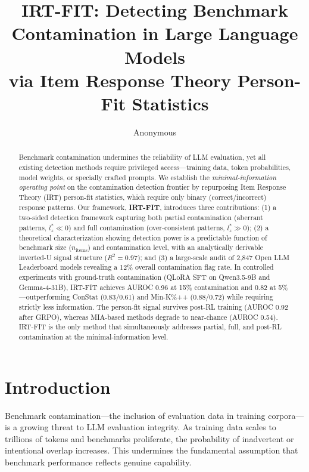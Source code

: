 \documentclass[11pt,a4paper]{article}
\title{IRT-FIT: Detecting Benchmark Contamination in Large Language Models\\via Item Response Theory Person-Fit Statistics}
\author{Anonymous}
\date{}
\begin{document}
\maketitle

\begin{abstract}
Benchmark contamination undermines the reliability of LLM evaluation, yet all existing detection methods require privileged access---training data, token probabilities, model weights, or specially crafted prompts. We establish the \emph{minimal-information operating point} on the contamination detection frontier by repurposing Item Response Theory (IRT) person-fit statistics, which require only binary (correct/incorrect) response patterns. Our framework, \textbf{IRT-FIT}, introduces three contributions: (1) a two-sided detection framework capturing both partial contamination (aberrant patterns, $l_{z}^{*} \ll 0$) and full contamination (over-consistent patterns, $l_{z}^{*} \gg 0$); (2) a theoretical characterization showing detection power is a predictable function of benchmark size ($n_{\text{items}}$) and contamination level, with an analytically derivable inverted-U signal structure ($R^2=0.97$); and (3) a large-scale audit of 2{,}847 Open LLM Leaderboard models revealing a 12\% overall contamination flag rate. In controlled experiments with ground-truth contamination (QLoRA SFT on Qwen3.5-9B and Gemma-4-31B), IRT-FIT achieves AUROC 0.96 at 15\% contamination and 0.82 at 5\%---outperforming ConStat (0.83/0.61) and Min-K\%++ (0.88/0.72) while requiring strictly less information. The person-fit signal survives post-RL training (AUROC 0.92 after GRPO), whereas MIA-based methods degrade to near-chance (AUROC 0.54). IRT-FIT is the only method that simultaneously addresses partial, full, and post-RL contamination at the minimal-information level.
\end{abstract}

\section{Introduction}
\label{sec:intro}

Benchmark contamination---the inclusion of evaluation data in training corpora---is a growing threat to LLM evaluation integrity. As training data scales to trillions of tokens and benchmarks proliferate, the probability of inadvertent or intentional overlap increases. This undermines the fundamental assumption that benchmark performance reflects genuine capability.
\end{document}

